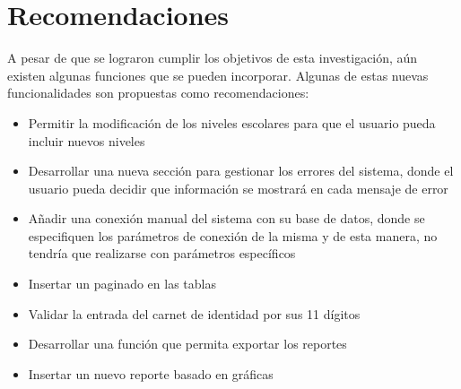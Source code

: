 \chapter*{Recomendaciones}
A pesar de que se lograron cumplir los objetivos de esta investigación, aún existen algunas funciones que se pueden incorporar. Algunas de estas nuevas funcionalidades son propuestas como recomendaciones:

\begin{itemize}
\item Permitir la modificación de los niveles escolares para que el usuario pueda incluir nuevos niveles
\item Desarrollar una nueva sección para gestionar los errores del sistema, donde el usuario pueda decidir que información se mostrará en cada mensaje de error
\item Añadir una conexión manual del sistema con su base de datos, donde se especifiquen los parámetros de conexión de la misma y de esta manera, no tendría que realizarse con parámetros específicos
\item Insertar un paginado en las tablas
\item Validar la entrada del carnet de identidad por sus 11 dígitos
\item Desarrollar una función que permita exportar los reportes
\item Insertar un nuevo reporte basado en gráficas
\end{itemize}